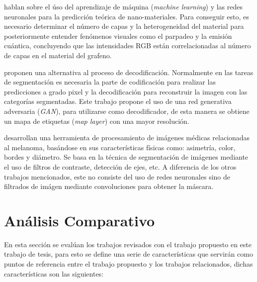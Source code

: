 \citet{zhou2019emerging} hablan sobre el úso del aprendizaje de máquina (\emph{machine learning}) y las redes neuronales para la predicción teórica de nano-materiales. Para conseguir esto, es necesario determinar el número de capas y la heterogeneidad del material para posteriormente entender fenómenos visuales como el parpadeo y la emisión cuántica, concluyendo que las intensidades RGB están correlacionadas al número de capas en el material del grafeno. 


\citet{DBLP:journals/corr/LucCCV16} proponen una alternativa al proceso de decodificación. Normalmente en las tareas de segmentación es necesaria la parte de codificación para realizar las predicciones a grado pixel y la decodificación para reconstruir la imagen con las categorías segmentadas. Este trabajo propone el uso de una red generativa adversaria (\emph{GAN}), para utilizarse como decodificador, de esta manera se obtiene un mapa de etiquetas (\emph{map layer}) con una mayor resolución.

\citet{JAIN2015735} desarrollan una herramienta de procesamiento de imágenes médicas relacionadas al melanoma, basándose en sus características físicas como: asimetría, color, bordes y diámetro. Se basa en la técnica de segmentación de imágenes mediante el uso de filtros de contraste, detección de ejes, etc. A diferencia de los otros trabajos mencionados, este no consiste del uso de redes neuronales sino de filtrados de imágen mediante convoluciones para obtener la máscara.


\section{Análisis Comparativo}
En esta sección se evalúan los trabajos revisados con el trabajo propuesto en este trabajo de tesis, para esto se define una serie de características que servirán como puntos de referencia entre el trabajo propuesto y los trabajos relacionados, dichas características son las siguientes:

